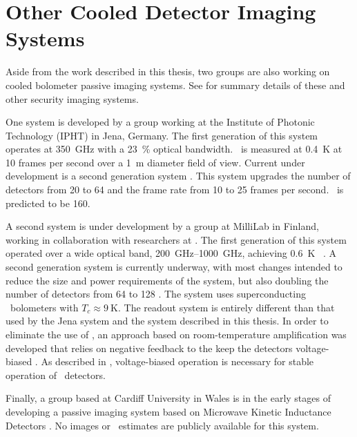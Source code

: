 \section{Other Cooled Detector Imaging Systems}

Aside from the work described in this thesis, two groups are also working on cooled bolometer passive imaging systems.
See  for summary details of these and other security imaging systems.

One system is developed by a group working at the Institute of Photonic Technology (IPHT) in Jena, Germany.
The first generation of this system \cite{heinz_toward_2011} operates at \SI{350}{\GHz} with a \SI{23}{\percent} optical bandwidth.
\NETD\ is measured at \SI{0.4}{\K} at 10 frames per second over a \SI{1}{\m} diameter field of view.
Current under development is a second generation system \cite{heinz_development_2013,may_next_2013}.
This system upgrades the number of detectors from 20 to 64 and the frame rate from 10 to 25 frames per second.
\NETD\ is predicted to be \SI{160}{\mK}.

A second system is under development by a group at MilliLab in Finland, working in collaboration with researchers at \NIST.
The first generation of this system operated over a wide optical band, \SIrange{200}{1000}{\GHz}, achieving \SI{0.6}{\K} \NETD\ \cite{grossman_passive_2010}.
A second generation system is currently underway, with most changes intended to reduce the size and power requirements of the system, but also doubling the number of detectors from 64 to 128 \cite{luukanen_applications_2012}.
The system uses superconducting \TES\ bolometers with $T_c \approx \SI{9}{\K}$.
The readout system is entirely different than that used by the Jena system and the system described in this thesis.
In order to eliminate the use of \SQUIDs, an approach based on room-temperature amplification was developed that relies on negative feedback to the keep the detectors voltage-biased \cite{penttila_low-noise_2006}.
As described in , voltage-biased operation is necessary for stable operation of \TES\ detectors.

Finally, a group based at Cardiff University in Wales is in the early stages of developing a passive imaging system \cite{day_broadband_2003} based on Microwave Kinetic Inductance Detectors \cite{wood_kidcam_2011}.
No images or \NETD\ estimates are publicly available for this system.


